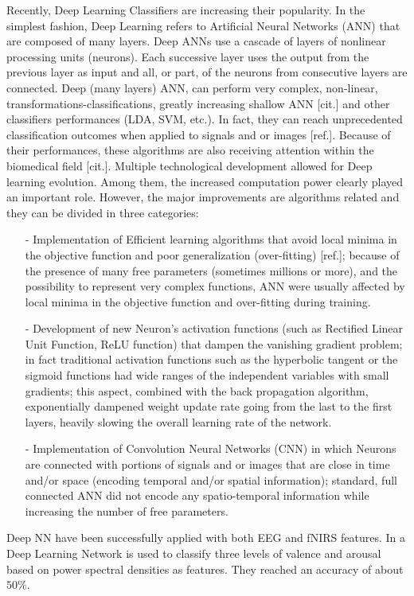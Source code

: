\documentclass[12pt ]{iopart}
\begin{document}
Recently, Deep Learning Classifiers are increasing their popularity. In the simplest fashion, Deep Learning  refers to Artificial Neural Networks (ANN) that are composed of many layers. Deep ANNs use a cascade of  layers of nonlinear processing units (neurons). Each successive layer uses the output from the previous layer as input and all, or part, of the neurons from consecutive layers are connected. Deep (many layers) ANN, can perform very complex, non-linear, transformations-classifications, greatly increasing shallow ANN  [cit.]  and other classifiers performances (LDA, SVM, etc.). In fact, they can reach unprecedented classification outcomes when applied to signals and or images [ref.]. Because of their performances, these algorithms are also receiving  attention within the biomedical field [cit.]. 
Multiple technological development allowed for Deep learning evolution. 
Among them, the increased computation power clearly played an important role.
However, the major improvements are algorithms related and they can be divided in three  categories:
\begin{itemize}
	\item[-] Implementation of Efficient learning algorithms that avoid local minima in the objective function and poor generalization (over-fitting) [ref.]; because of the presence of many free parameters (sometimes millions or more), and the possibility to represent very complex functions, ANN were usually affected by local minima in the objective function and over-fitting  during training. 
	\item[-] Development of new Neuron's activation functions (such as Rectified Linear Unit Function, ReLU function) that dampen  the vanishing gradient problem; in fact traditional activation functions such as the hyperbolic tangent or the sigmoid functions had wide ranges of the independent variables with small gradients;  this aspect, combined with the back propagation algorithm, exponentially dampened weight update rate going from the last to the first layers, heavily slowing the overall learning rate of the network.
	\item[-] Implementation of Convolution Neural Networks (CNN) in which Neurons are connected with portions of signals and or images that are close in time and/or space (encoding temporal and/or spatial information); standard, full connected ANN  did not encode any   spatio-temporal information while increasing the number of free parameters.
\end{itemize}
Deep NN have been successfully applied with  both EEG and fNIRS features. In \textcite{jirayucharoensak2014eeg} a Deep Learning Network is used to classify three levels of valence and arousal based on power spectral densities as features. They reached an accuracy of about $50\%$. 
\end{document}
